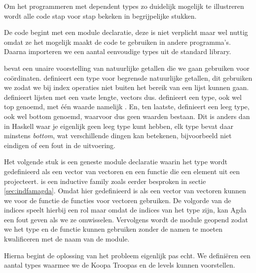 Om het programmeren met dependent types zo duidelijk mogelijk te illustreren
wordt alle code stap voor stap bekeken in begrijpelijke stukken.  

De code begint met een module declaratie, deze is niet verplicht maar wel
nuttig omdat ze het mogelijk maakt de code te gebruiken in andere programma's.
Daarna importeren we een aantal eenvoudige types uit de standard library.


 bevat een unaire voorstelling van natuurlijke getallen die we
gaan gebruiken voor coördinaten.  definieert een type voor
begrensde natuurlijke getallen, dit gebruiken we zodat we bij index operaties
niet buiten het bereik van een lijst kunnen gaan.  definieert
lijsten met een vaste lengte, vectors dus.  definieert een
type,  ook wel top genoemd, met één waarde namelijk . En,
ten laatste,  definieert een leeg type,  ook wel
bottom genoemd, waarvoor dus geen waarden bestaan. Dit is anders dan in Haskell
waar je eigenlijk geen leeg type kunt hebben, elk type bevat daar minstens
\emph{bottom}, wat verschillende dingen kan betekenen, bijvoorbeeld niet
eindigen of een fout in de uitvoering.

Het volgende stuk is een geneste module declaratie waarin het type
 wordt gedefinieerd als een vector van vectoren en een functie
die een element uit een  projecteert.  is een
inductive family zoals eerder besproken in sectie \ref{sec:indfamagda}. Omdat
 hier gedefinieerd is als een vector van vectoren kunnen we voor
de  functie de  functies voor vectoren gebruiken.
De volgorde van de indices speelt hierbij een rol maar omdat de indices van het
type  zijn, kan Agda een fout geven als we ze omwisselen.
Vervolgens wordt de module geopend zodat we het type en de functie kunnen
gebruiken zonder de namen te moeten kwalificeren met de naam van de module.


Hierna begint de oplossing van het probleem eigenlijk pas echt. We definiëren
een aantal types waarmee we de Koopa Troopas en de levels kunnen voorstellen.


